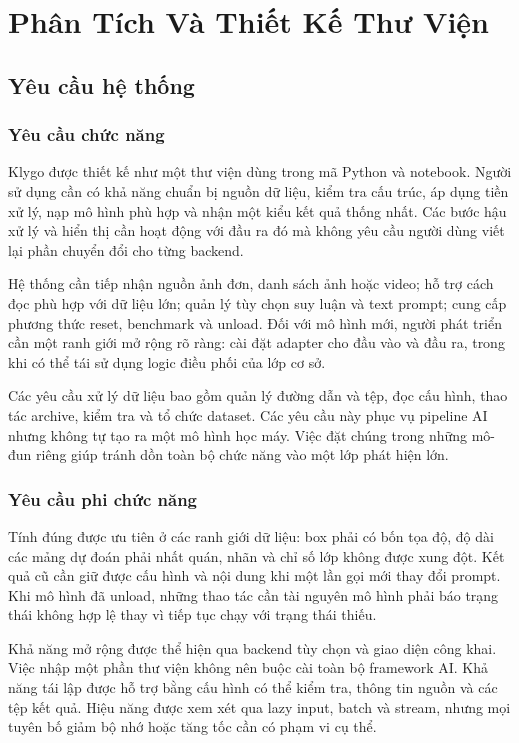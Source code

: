 \chapter{Phân Tích Và Thiết Kế Thư Viện}
\label{chap:design}
\section{Yêu cầu hệ thống}
\subsection{Yêu cầu chức năng}
Klygo được thiết kế như một thư viện dùng trong mã Python và notebook. Người sử dụng cần có khả năng chuẩn bị nguồn dữ liệu, kiểm tra cấu trúc, áp dụng tiền xử lý, nạp mô hình phù hợp và nhận một kiểu kết quả thống nhất. Các bước hậu xử lý và hiển thị cần hoạt động với đầu ra đó mà không yêu cầu người dùng viết lại phần chuyển đổi cho từng backend.

Hệ thống cần tiếp nhận nguồn ảnh đơn, danh sách ảnh hoặc video; hỗ trợ cách đọc phù hợp với dữ liệu lớn; quản lý tùy chọn suy luận và text prompt; cung cấp phương thức reset, benchmark và unload. Đối với mô hình mới, người phát triển cần một ranh giới mở rộng rõ ràng: cài đặt adapter cho đầu vào và đầu ra, trong khi có thể tái sử dụng logic điều phối của lớp cơ sở.

Các yêu cầu xử lý dữ liệu bao gồm quản lý đường dẫn và tệp, đọc cấu hình, thao tác archive, kiểm tra và tổ chức dataset. Các yêu cầu này phục vụ pipeline AI nhưng không tự tạo ra một mô hình học máy. Việc đặt chúng trong những mô-đun riêng giúp tránh dồn toàn bộ chức năng vào một lớp phát hiện lớn.

\subsection{Yêu cầu phi chức năng}
Tính đúng được ưu tiên ở các ranh giới dữ liệu: box phải có bốn tọa độ, độ dài các mảng dự đoán phải nhất quán, nhãn và chỉ số lớp không được xung đột. Kết quả cũ cần giữ được cấu hình và nội dung khi một lần gọi mới thay đổi prompt. Khi mô hình đã unload, những thao tác cần tài nguyên mô hình phải báo trạng thái không hợp lệ thay vì tiếp tục chạy với trạng thái thiếu.

Khả năng mở rộng được thể hiện qua backend tùy chọn và giao diện công khai. Việc nhập một phần thư viện không nên buộc cài toàn bộ framework AI. Khả năng tái lập được hỗ trợ bằng cấu hình có thể kiểm tra, thông tin nguồn và các tệp kết quả. Hiệu năng được xem xét qua lazy input, batch và stream, nhưng mọi tuyên bố giảm bộ nhớ hoặc tăng tốc cần có phạm vi cụ thể.

